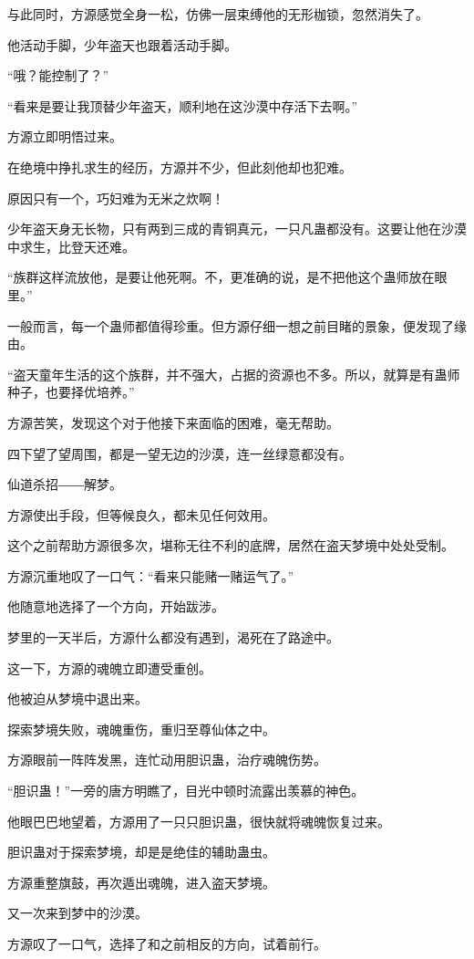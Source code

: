 \begin{this_body}
与此同时，方源感觉全身一松，仿佛一层束缚他的无形枷锁，忽然消失了。

他活动手脚，少年盗天也跟着活动手脚。

“哦？能控制了？”

“看来是要让我顶替少年盗天，顺利地在这沙漠中存活下去啊。”

方源立即明悟过来。

在绝境中挣扎求生的经历，方源并不少，但此刻他却也犯难。

原因只有一个，巧妇难为无米之炊啊！

少年盗天身无长物，只有两到三成的青铜真元，一只凡蛊都没有。这要让他在沙漠中求生，比登天还难。

“族群这样流放他，是要让他死啊。不，更准确的说，是不把他这个蛊师放在眼里。”

一般而言，每一个蛊师都值得珍重。但方源仔细一想之前目睹的景象，便发现了缘由。

“盗天童年生活的这个族群，并不强大，占据的资源也不多。所以，就算是有蛊师种子，也要择优培养。”

方源苦笑，发现这个对于他接下来面临的困难，毫无帮助。

四下望了望周围，都是一望无边的沙漠，连一丝绿意都没有。

仙道杀招――解梦。

方源使出手段，但等候良久，都未见任何效用。

这个之前帮助方源很多次，堪称无往不利的底牌，居然在盗天梦境中处处受制。

方源沉重地叹了一口气：“看来只能赌一赌运气了。”

他随意地选择了一个方向，开始跋涉。

梦里的一天半后，方源什么都没有遇到，渴死在了路途中。

这一下，方源的魂魄立即遭受重创。

他被迫从梦境中退出来。

探索梦境失败，魂魄重伤，重归至尊仙体之中。

方源眼前一阵阵发黑，连忙动用胆识蛊，治疗魂魄伤势。

“胆识蛊！”一旁的唐方明瞧了，目光中顿时流露出羡慕的神色。

他眼巴巴地望着，方源用了一只只胆识蛊，很快就将魂魄恢复过来。

胆识蛊对于探索梦境，却是是绝佳的辅助蛊虫。

方源重整旗鼓，再次遁出魂魄，进入盗天梦境。

又一次来到梦中的沙漠。

方源叹了一口气，选择了和之前相反的方向，试着前行。


\end{this_body}
